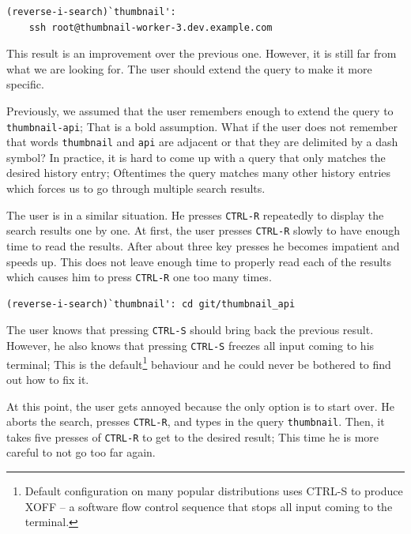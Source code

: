 

\begin{verbatim}
(reverse-i-search)`thumbnail':
    ssh root@thumbnail-worker-3.dev.example.com
\end{verbatim}

This result is an improvement over the previous one. However, it is still far from what we are looking for. The user should extend the query to make it more specific. 

Previously, we assumed that the user remembers enough to extend the query to \verb|thumbnail-api|; That is a bold assumption. What if the user does not remember that words \verb|thumbnail| and \verb|api| are adjacent or that they are delimited by a dash symbol? In practice, it is hard to come up with a query that only matches the desired history entry; Oftentimes the query matches many other history entries which forces us to go through multiple search results.


The user is in a similar situation. He presses \verb|CTRL-R| repeatedly to display the search results one by one. At first, the user presses \verb|CTRL-R| slowly to have enough time to read the results. After about three key presses he becomes impatient and speeds up. This does not leave enough time to properly read each of the results which causes him to press \verb|CTRL-R| one too many times.

\begin{verbatim}
(reverse-i-search)`thumbnail': cd git/thumbnail_api
\end{verbatim}

The user knows that pressing \verb|CTRL-S| should bring back the previous result. However, he also knows that pressing \verb|CTRL-S| freezes all input coming to his terminal; This is the default\footnote{Default configuration on many popular distributions uses CTRL-S to produce XOFF -- a software flow control sequence that stops all input coming to the terminal.} behaviour and he could never be bothered to find out how to fix it.

At this point, the user gets annoyed because the only option is to start over. He aborts the search, presses \verb|CTRL-R|, and types in the query \verb|thumbnail|. Then, it takes five presses of \verb|CTRL-R| to get to the desired result; This time he is more careful to not go too far again.


